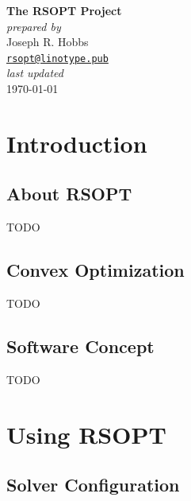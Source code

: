 \documentclass[12pt,titlepage]{report}
\begin{document}
	\begin{titlepage}
		\begin{center}
			\vspace*{5cm}
			{\Huge \textbf{The RSOPT Project}} \\
			\vspace*{2cm}
			{\large
				\textit{prepared by} \\
				\vspace*{0.2cm}
				Joseph R. Hobbs \\
				\vspace*{0.3cm}
				\href{mailto:rsopt@linotype.pub}{\texttt{rsopt@linotype.pub}}
			} \\
			\vspace*{2cm}
			{\large
				\textit{last updated} \\
				\vspace*{0.2cm}
				\today
			}
			\vfill
		\end{center}
	\end{titlepage}
	
	\tableofcontents
	
	\part{Introduction}
	
	\chapter{About RSOPT}
	
	TODO
	
	\chapter{Convex Optimization}
	
	TODO

	\chapter{Software Concept}
	
	TODO
	
	\part{Using RSOPT}
	
	\chapter{Solver Configuration}
	
\end{document}
